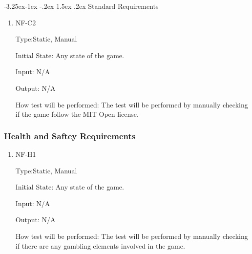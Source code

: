 \documentclass[12pt, titlepage]{article}
\makeatletter
\renewcommand\paragraph{\@startsection{paragraph}{4}{\z@}%
                                     {-3.25ex\@plus -1ex \@minus -.2ex}%
                                     {1.5ex \@plus .2ex}%
                                     {\normalfont\normalsize\bfseries}}
\makeatother
\begin{document}
\paragraph{Standard Requirements}
\begin{enumerate}
\item{NF-C2\\}

Type:Static, Manual 
					
Initial State: Any state of the game.
					
Input: N/A 
					
Output: N/A
					
How test will be performed: The test will be performed by manually checking if the game follow the MIT Open license.

\end{enumerate}
\subsubsection{Health and Saftey Requirements}
\begin{enumerate}
\item{NF-H1\\}

Type:Static, Manual 
					
Initial State: Any state of the game.
					
Input: N/A 
					
Output: N/A
					
How test will be performed: The test will be performed by manually checking if there are any gambling elements involved in the game.

\end{enumerate}

\newpage
\end{document}
